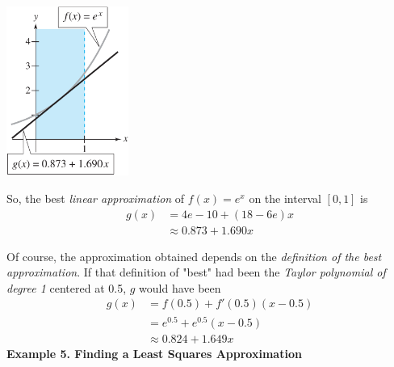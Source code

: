 \documentclass{article}
\begin{document}
    \begin{minipage}{0.3\linewidth}
        \includegraphics[width = 4cm]{images/ansint1.png}
    \end{minipage}
    \begin{minipage}{0.6\linewidth}
        So, the best \textit{linear approximation} of $f(x) = e^x$ on the interval $[0,1]$ is
        \begin{equation*}
            \begin{split}
                g(x) &= 4e - 10 + (18 - 6e)x \\
                     &\approx 0.873 + 1.690x
            \end{split}
        \end{equation*}
    \end{minipage}

    Of course, the approximation obtained depends on the \textit{definition of the best approximation}. If that 
    definition of "best" had been the \textit{Taylor polynomial of degree 1} centered at 0.5, $g$ would have been
    \begin{equation*}
        \begin{split}
            g(x) &= f(0.5) + f'(0.5)(x - 0.5) \\
                 &= e^{0.5} + e^{0.5}(x - 0.5) \\
                 &\approx 0.824 + 1.649x
        \end{split}
    \end{equation*}
    \textbf{Example 5. \textcolor{blue5}{Finding a Least Squares Approximation}}
\end{document}

